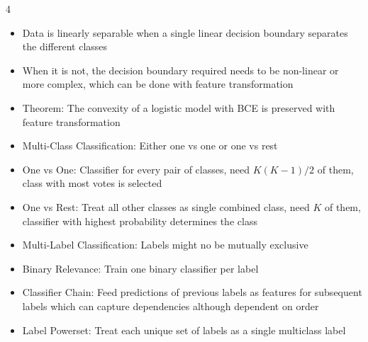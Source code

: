 \documentclass[10pt, landscape]{article}
\begin{document}
\begin{multicols*}{4}
\begin{itemize}
    \item Data is linearly separable when a single linear decision boundary separates the different classes
    \item When it is not, the decision boundary required needs to be non-linear or more complex, which can be done with feature transformation
    \item Theorem: The convexity of a logistic model with BCE is preserved with feature transformation
    \item Multi-Class Classification: Either one vs one or one vs rest
    \item One vs One: Classifier for every pair of classes, need $K(K-1)/2$ of them, class with most votes is selected
    \item One vs Rest: Treat all other classes as single combined class, need $K$ of them, classifier with highest probability determines the class
    \item Multi-Label Classification: Labels might no be mutually exclusive
    \item Binary Relevance: Train one binary classifier per label
    \item Classifier Chain: Feed predictions of previous labels as features for subsequent labels which can capture dependencies although dependent on order
    \item Label Powerset: Treat each unique set of labels as a single multiclass label
\end{itemize}


\end{multicols*}
\end{document}
